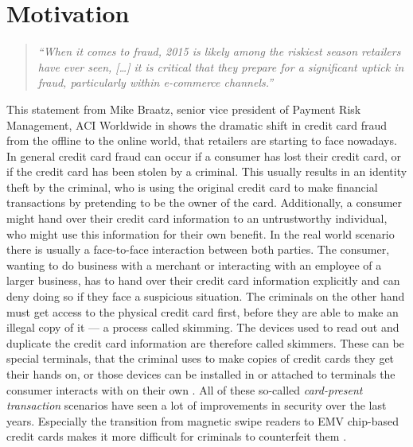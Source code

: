 
\section{Motivation}
\label{sec:motivation}

\begin{quotation}
    \textit{\enquote{When it comes to fraud, 2015 is likely among the riskiest season retailers have ever seen, […]
    it is critical that they prepare for a significant uptick in fraud, particularly within e-commerce channels.} \citep{Reuters2015}}
\end{quotation}

This statement from Mike Braatz, senior vice president of Payment Risk Management, ACI Worldwide in \citep{Reuters2015} shows the dramatic shift in credit card fraud from the offline to the online world, that retailers are starting to face nowadays. \\

In general credit card fraud can occur if a consumer has lost their credit card, or if the credit card has been stolen by a criminal. This usually results in an identity theft by the criminal, who is using the original credit card to make financial transactions by pretending to be the owner of the card. Additionally, a consumer might hand over their credit card information to an untrustworthy individual, who might use this information for their own benefit. In the real world scenario there is usually a face-to-face interaction between both parties. The consumer, wanting to do business with a merchant or interacting with an employee of a larger business, has to hand over their credit card information explicitly and can deny doing so if they face a suspicious situation. The criminals on the other hand must get access to the physical credit card first, before they are able to make an illegal copy of it --- a process called skimming. The devices used to read out and duplicate the credit card information are therefore called skimmers. These can be special terminals, that the criminal uses to make copies of credit cards they get their hands on, or those devices can be installed in or attached to terminals the consumer interacts with on their own \citep{ConsumerAction2009}. All of these so-called \emph{card-present transaction} scenarios have seen a lot of improvements in security over the last years. Especially the transition from magnetic swipe readers to \gls{EMV} chip-based credit cards makes it more difficult for criminals to counterfeit them \citep{Lewis2015}. \\

